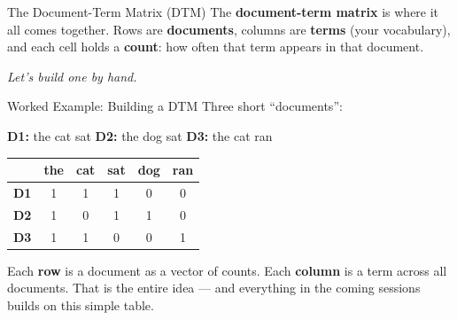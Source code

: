 \documentclass[aspectratio=169]{beamer}
\begin{document}
\begin{frame}{The Document-Term Matrix (DTM)}
\vspace{0.2cm}
{\small The \textbf{document-term matrix} is where it all comes together.
Rows are \textbf{documents}, columns are \textbf{terms} (your vocabulary),
and each cell holds a \textbf{count}: how often that term appears in that document.}

\bigskip
{}

\bigskip
{\small\textcolor{midgray}{\textit{Let's build one by hand.}}}
\end{frame}

\begin{frame}{Worked Example: Building a DTM}
\vspace{0.2cm}
{\small Three short ``documents'':}
\smallskip

{\small
\textbf{D1:} the cat sat \quad
\textbf{D2:} the dog sat \quad
\textbf{D3:} the cat ran}

\bigskip
\begin{center}
\setlength{\arrayrulewidth}{0.3pt}
\renewcommand{\arraystretch}{1.4}
\begin{tabular}{l|ccccc}
  & \textbf{the} & \textbf{cat} & \textbf{sat} & \textbf{dog} & \textbf{ran} \\
\hline
\textbf{D1} & 1 & 1 & 1 & 0 & 0 \\
\textbf{D2} & 1 & 0 & 1 & 1 & 0 \\
\textbf{D3} & 1 & 1 & 0 & 0 & 1 \\
\end{tabular}
\end{center}

\bigskip
{\small Each \textbf{row} is a document as a vector of counts. Each \textbf{column}
is a term across all documents. That is the entire idea --- and everything in the
coming sessions builds on this simple table.}
\end{frame}
\end{document}
